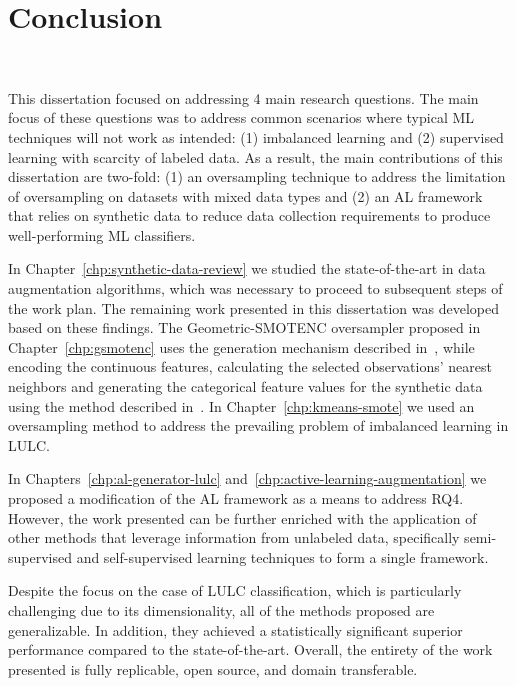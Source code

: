 \chapter{Conclusion}~\label{chp:conclusion}

This dissertation focused on addressing 4 main research questions. The main
focus of these questions was to address common scenarios where typical ML
techniques will not work as intended: (1) imbalanced learning and (2)
supervised learning with scarcity of labeled data. As a result, the main
contributions of this dissertation are two-fold: (1) an oversampling technique
to address the limitation of oversampling on datasets with mixed data types
and (2) an AL framework that relies on synthetic data to reduce data
collection requirements to produce well-performing ML classifiers.

In Chapter~\ref{chp:synthetic-data-review} we studied the state-of-the-art in
data augmentation algorithms, which was necessary to proceed to subsequent
steps of the work plan. The remaining work presented in this dissertation was
developed based on these findings. The Geometric-SMOTENC oversampler proposed
in Chapter~\ref{chp:gsmotenc} uses the generation mechanism described
in~\cite{Douzas2019}, while encoding the continuous features, calculating the
selected observations' nearest neighbors and generating the categorical
feature values for the synthetic data using the method described
in~\cite{Chawla2002}. In Chapter~\ref{chp:kmeans-smote} we used an
oversampling method to address the prevailing problem of imbalanced learning
in LULC\@.

In Chapters~\ref{chp:al-generator-lulc}
and~\ref{chp:active-learning-augmentation} we proposed a modification of the
AL framework as a means to address RQ4. However, the work presented can be
further enriched with the application of other methods that leverage
information from unlabeled data, specifically semi-supervised and
self-supervised learning techniques to form a single framework.

Despite the focus on the case of LULC classification, which is particularly
challenging due to its dimensionality, all of the methods proposed are
generalizable. In addition, they achieved a statistically significant superior
performance compared to the state-of-the-art. Overall, the entirety of the
work presented is fully replicable, open source, and domain transferable. 
